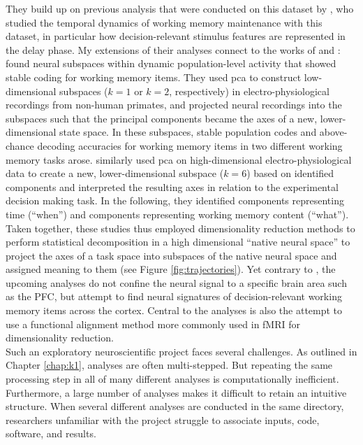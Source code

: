 They build up on previous analysis that were conducted on this dataset by \citet{kaiserposter}, who studied the temporal dynamics of working memory maintenance with this dataset, in particular how decision-relevant stimulus features are represented in the delay phase.
My extensions of their analyses connect to the works of \citet{murray2017stable} and \citet{machens2010functional}:
\citet{murray2017stable} found neural subspaces within dynamic population-level activity that showed stable coding for working memory items. They used \gls{pca} to construct low-dimensional subspaces ($k = 1$ or $k = 2$, respectively) in electro-physiological recordings from non-human primates, and projected neural recordings into the subspaces such that the principal components became the axes of a new, lower-dimensional state space. In these subspaces, stable population codes and above-chance decoding accuracies for working memory items in two different working memory tasks arose.
\citet{machens2010functional} similarly used \gls{pca} on high-dimensional electro-physiological data to create a new, lower-dimensional subspace ($k = 6$) based on identified components and interpreted the resulting axes in relation to the experimental decision making task.
In the following, they identified components representing time (``when'') and components representing working memory content (``what'').
Taken together, these studies thus employed dimensionality reduction methods to perform statistical decomposition in a high dimensional ``native neural space'' to project the axes of a task space into subspaces of the native neural space and assigned meaning to them (see Figure \ref{fig:trajectories}).
Yet contrary to \citet{murray2017stable, machens2010functional}, the upcoming analyses do not confine the neural signal to a specific brain area such as the PFC, but attempt to find neural signatures of decision-relevant working memory items across the cortex.
Central to the analyses is also the attempt to use a functional alignment method more commonly used in \gls{fMRI} for  dimensionality reduction.\\
Such an exploratory neuroscientific project faces several challenges.
As outlined in Chapter \ref{chap:k1}, analyses are often multi-stepped.
But repeating the same processing step in all of many different analyses is computationally inefficient.
Furthermore, a large number of analyses makes it difficult to retain an intuitive structure.
When several different analyses are conducted in the same directory, researchers unfamiliar with the project struggle to associate inputs, code, software, and results.
